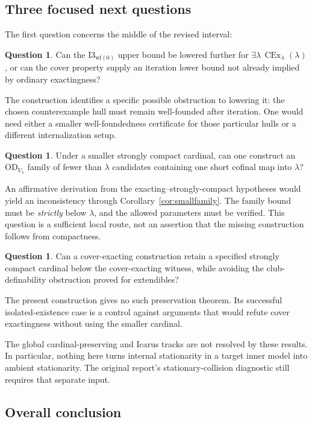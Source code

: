\documentclass[11pt,letterpaper]{article}
\theoremstyle{definition}
\newcommand{\OD}{\mathrm{OD}}
\newcommand{\CEx}{\operatorname{CEx}}
\newcommand{\Iwf}{\mathrm{I3}_{\mathrm{wf}(0)}}
\newtheorem{question}[definition]{Question}
\begin{document}
\subsection{Three focused next questions}

The first question concerns the middle of the revised interval:
\begin{question}
Can the $\Iwf$ upper bound be lowered further for
$\exists\lambda\,\CEx_\lambda(\lambda)$, or can the cover property supply
an iteration lower bound not already implied by ordinary exactingness?
\end{question}
The construction identifies a specific possible obstruction to lowering
it: the chosen counterexample hull must remain well-founded after
iteration. One would need either a smaller well-foundedness certificate
for those particular hulls or a different internalization setup.

\begin{question}
Under a smaller strongly compact cardinal, can one construct an
$\OD_{V_\lambda}$ family of fewer than $\lambda$ candidates containing
one short cofinal map into $\lambda$?
\end{question}
An affirmative derivation from the exacting--strongly-compact hypotheses
would yield an inconsistency through Corollary~\ref{cor:smallfamily}.
The family bound must be \emph{strictly} below $\lambda$, and the allowed
parameters must be verified. This question is a sufficient local route,
not an assertion that the missing construction follows from compactness.

\begin{question}
Can a cover-exacting construction retain a specified strongly compact
cardinal below the cover-exacting witness, while avoiding the
club-definability obstruction proved for extendibles?
\end{question}
The present construction gives no such preservation theorem. Its
successful isolated-existence case is a control against arguments that
would refute cover exactingness without using the smaller cardinal.

The global cardinal-preserving and Icarus tracks are not resolved by
these results. In particular, nothing here turns internal stationarity
in a target inner model into ambient stationarity. The original report's
stationary-collision diagnostic still requires that separate input.

\subsection{Overall conclusion}
\end{document}
